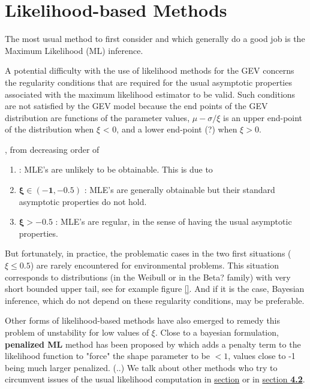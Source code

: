 \documentclass[11pt,a4paper,openany ]{book}
\begin{document}
\section{Likelihood-based Methods}\label{likintro}

The most usual method to first consider and which generally do a good job is the Maximum Likelihood (ML) inference.

A potential difficulty with the use of likelihood methods for the GEV concerns the regularity conditions that are required for the usual asymptotic properties associated with the
maximum likelihood estimator to be valid. Such conditions are not satisfied by the GEV
model because the end points of the GEV distribution are functions of the parameter values,
$\mu-\sigma/\xi$ is an upper end-point of the distribution when $\xi$ < 0, and a lower end-point (?) when
$\xi > 0$. \citet{saeb_general_2014}


, from decreasing order of 
\citet[pp.55]{coles_introduction_2001}

\begin{enumerate}
	\item\label{it1lik}  : MLE's are unlikely to be obtainable. This is due to 
	\item $\boldsymbol{\xi\in(-1,-0.5)}$ : MLE's are generally obtainable but their standard asymptotic properties do not hold.
	\item $\boldsymbol{\xi>-0.5}$ : MLE's are regular, in the sense of having the usual asymptotic properties.
\end{enumerate}


But fortunately, in practice, the problematic cases in the two first situations ($\xi\leq 0.5$) are rarely encountered for environmental problems. This situation corresponds to distributions (in the Weibull or in the Beta? family) with very short bounded upper tail, see for example figure \ref{}.
And if it is the case, Bayesian inference, which do not depend on these regularity conditions, may be preferable.

Other forms of likelihood-based methods have also emerged to remedy this problem of unstability for low values of $\xi$. Close to a bayesian formulation, \textbf{ penalized ML} method has been proposed by \citet{coles_likelihood-based_1999} which adds a penalty term to the likelihood function to "force" the shape parameter to be $<1$, %
values close to -1 being much larger penalized. (..) We talk about other methods who try to circumvent issues of the usual likelihood computation in \hyperref[pwmm]{section} or in \hyperref[improvinf]{section\textbf{ 4.2}}.
\end{document}
